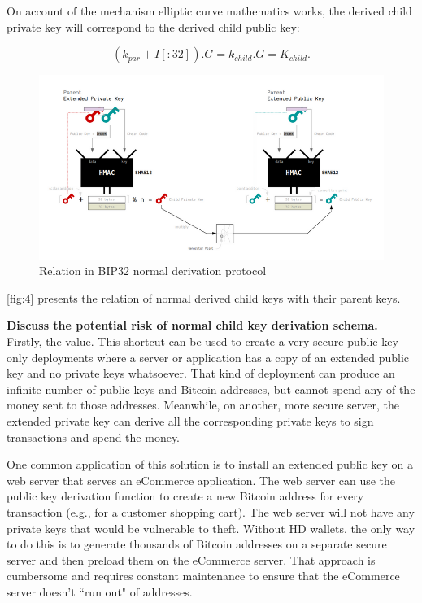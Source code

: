 On account of the mechanism elliptic curve mathematics works, the derived child private key will correspond to the derived child public key:

\begin{equation}
    (k_{par} + I[:32]) . G  =  k_{child} . G =  K_{child}.
\end{equation}

\bigskip
\begin{figure}[ht!]
    \centering
    \includegraphics[width=1\textwidth]{images/relation_bip32.png}
    \caption[Relation in BIP32 normal derivation protocol]{Relation in BIP32 normal derivation protocol \cite{learnme}}
    \label{fig:4}
\end{figure}

\autoref{fig:4} presents the relation of normal derived child keys with their parent keys.

\bigskip
{\textbf{Discuss the potential risk of normal child key derivation schema.}}
\label{bip32vul}
    Firstly, the value. This shortcut can be used to create a very secure public key–only deployments where a server or application has a copy of an extended public key and no private keys whatsoever. That kind of deployment can produce an infinite number of public keys and Bitcoin addresses, but cannot spend any of the money sent to those addresses. Meanwhile, on another, more secure server, the extended private key can derive all the corresponding private keys to sign transactions and spend the money.

    One common application of this solution is to install an extended public key on a web server that serves an eCommerce application. The web server can use the public key derivation function to create a new Bitcoin address for every transaction (e.g., for a customer shopping cart). The web server will not have any private keys that would be vulnerable to theft. Without HD wallets, the only way to do this is to generate thousands of Bitcoin addresses on a separate secure server and then preload them on the eCommerce server. That approach is cumbersome and requires constant maintenance to ensure that the eCommerce server doesn’t ``run out" of addresses.

